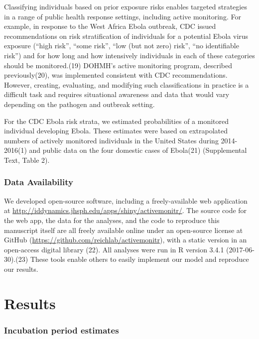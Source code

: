 \documentclass[]{article}
\begin{document}
Classifying individuals based on prior exposure risks enables targeted
strategies in a range of public health response settings, including
active monitoring. For example, in response to the West Africa Ebola
outbreak, CDC issued recommendations on risk stratification of
individuals for a potential Ebola virus exposure (``high risk'', ``some
risk'', ``low (but not zero) risk'', ``no identifiable risk'') and for
how long and how intensively individuals in each of these categories
should be monitored.(19) DOHMH's active monitoring program, described
previously(20), was implemented consistent with CDC recommendations.
However, creating, evaluating, and modifying such classifications in
practice is a difficult task and requires situational awareness and data
that would vary depending on the pathogen and outbreak setting.

For the CDC Ebola risk strata, we estimated probabilities of a monitored
individual developing Ebola. These estimates were based on extrapolated
numbers of actively monitored individuals in the United States during
2014-2016(1) and public data on the four domestic cases of Ebola(21)
(Supplemental Text, Table 2).

\subsubsection{Data Availability}\label{data-availability}

We developed open-source software, including a freely-available web
application at
\url{http://iddynamics.jhsph.edu/apps/shiny/activemonitr/}. The source
code for the web app, the data for the analyses, and the code to
reproduce this manuscript itself are all freely available online under
an open-source license at GitHub
(\url{https://github.com/reichlab/activemonitr}), with a static version
in an open-access digital library (22). All analyses were run in R
version 3.4.1 (2017-06-30).(23) These tools enable others to easily
implement our model and reproduce our results.

\section{Results}\label{results}

\subsubsection{Incubation period
estimates}\label{incubation-period-estimates}
\end{document}
